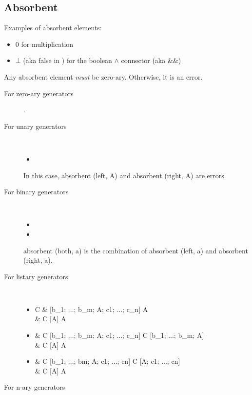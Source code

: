 \subsection{Absorbent}
\label{sec:absorbent}

Examples of absorbent elements:
\begin{itemize}
\item $0$ for multiplication 
\item $\bot$ (aka {\sf false} in \ocaml) for the boolean $\land$ connector (aka \&\&)
\end{itemize}

Any absorbent element {\em must} be zero-ary. Otherwise, it is an error.

\begin{description}
\item[For zero-ary generators] \na.
\item[For unary generators]~
  \begin{itemize}
  \item {}
  \end{itemize}

In this case, absorbent (left, A) and absorbent (right, A) are errors.

\item[For binary generators]~
  \begin{itemize}
  \item {}
  \item {}
  \end{itemize}
  absorbent (both, a) is the combination of absorbent (left, a) and
  absorbent (right, a). 

\item[For listary generators]~
  \begin{itemize}
  \item
    {C & [b_1; ...; b_m; A; c1; ...; c_n] \rw A \\
       &  C [A] \rw A
    }

  \item {}
    { & C [b_1; ...; b_m; A; c1; ...; c_n] \rw C [b_1; ...; b_m; A] \\
       &  C [A] \rw A
    }
  \item {}
    {&
      C [b_1; ...; bm; A; c1; ...; cn] \rw C [A; c1; ...; cn] \\
       & C [A] \rw A
    }
  \end{itemize}

\item[For n-ary generators] \na

\end{description}

